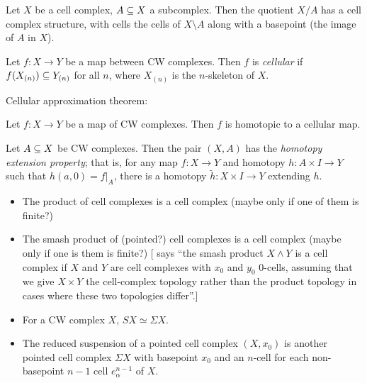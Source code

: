 \documentclass{MetricNotes2023}
\def\subq{\ensuremath\subseteq}
\begin{document}
\begin{definition}
Let \(X\) be a cell complex, \(A\subq X\) a subcomplex. Then the quotient \(X/A\) has a cell complex structure, with cells the cells of \(X\setminus A\) along with a basepoint (the image of \(A\) in \(X\)). 
\end{definition}

\begin{definition}
Let \(f : X \to Y\) be a map between CW complexes. Then \(f\) is \textit{cellular} if \(f(X_{(n)})\subq Y_{(n)}\) for all \(n\), where \(X_{(n)}\) is the \(n\)-skeleton of \(X\). 
\end{definition}

Cellular approximation theorem:

\begin{theorem}\label{2502211420}
Let \(f : X \to Y\) be a map of CW complexes. Then \(f\) is homotopic to a cellular map.
\end{theorem}

\begin{lemma}\label{2502211419}
Let \(A\subq X\) be CW complexes. Then the pair \((X, A)\) has the \textit{homotopy extension property}; that is, for any map \(f : X \to Y\) and homotopy \(h : A\times I \to Y\) such that \(h(a,0)=f|_A\), there is a homotopy \(\widetilde h : X\times I \to Y\) extending \(h\). 
\end{lemma}

\begin{itemize}
\item The product of cell complexes is a cell complex (maybe only if one of them is finite?)
\item The smash product of (pointed?) cell complexes is a cell complex (maybe only if one is them is finite?) [\autocite{hatcher} says ``the smash product \(X\wedge Y\) is a cell complex if \(X\) and \(Y\) are cell complexes with \(x_0\) and \(y_0\) \(0\)-cells, assuming that we give \(X\times Y\) the cell-complex topology rather than the product topology in cases where these two topologies differ''.]

\item For a CW complex \(X\), \(SX\simeq \Sigma X\).
\item The reduced suspension of a pointed cell complex \((X, x_0)\) is another pointed cell complex \(\Sigma X\) with basepoint \(x_0\) and an \(n\)-cell for each non-basepoint \(n-1\) cell \(e^{n-1}_\alpha\) of \(X\).
\end{itemize}
\end{document}
